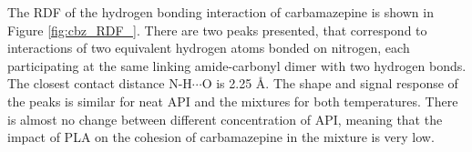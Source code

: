 The RDF of the hydrogen bonding interaction of carbamazepine is shown in Figure \ref{fig:cbz_RDF_}. There are two peaks presented, that correspond to interactions of two equivalent hydrogen atoms bonded on nitrogen, each participating at the same linking amide-carbonyl dimer with two hydrogen bonds. The closest contact distance N-H$\cdots$O is 2.25 \AA. The shape and signal response of the peaks is similar for neat API and the mixtures for both temperatures. There is almost no change between different concentration of API, meaning that the impact of PLA on the cohesion of carbamazepine in the mixture is very low.


\begin{figure}[htb]
	\centering
	\\

\end{figure}
